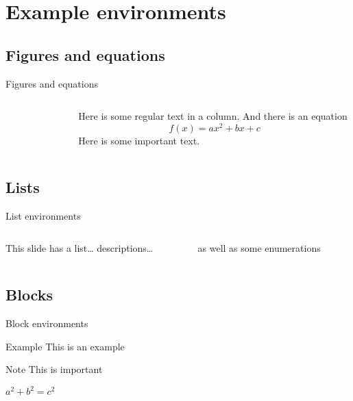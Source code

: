 \documentclass[aspectratio=169]{beamer}
\begin{document}
\section{Example environments}
\subsection{Figures and equations}
\begin{frame}{Figures and equations}
  \begin{columns}[onlytextwidth]
    \begin{column}{0.5\textwidth}
        \centering
        \begin{figure}
        \end{figure}
    \end{column}
    \begin{column}{0.4\textwidth}
    Here is some regular text in a column. And there is an equation
    \begin{displaymath}
      f(x)=ax^2+bx+c
    \end{displaymath}
    Here is some \alert{important} text.
    \end{column}
    \end{columns}
\end{frame}

\subsection{Lists}
\begin{frame}{List environments}
  \begin{columns}[onlytextwidth]
    \begin{column}{0.5\textwidth}
      This slide has a list\dots
      \blinditemize[3]
      \vspace*{5mm}
      descriptions\dots
      \blinddescription[2]
    \end{column}
    \begin{column}{0.5\textwidth}
      as well as some enumerations
      \blindenumerate[4]
    \end{column}
    \end{columns}
\end{frame}

\subsection{Blocks}
\begin{frame}{Block environments}
    \begin{exampleblock}{Example}
        This is an example
    \end{exampleblock}
    
    \begin{alertblock}{Note}
        This is important
    \end{alertblock}

    \begin{theorem}[Pythagoras] 
        $ a^2 + b^2 = c^2$
    \end{theorem}
\end{frame}
\end{document}
